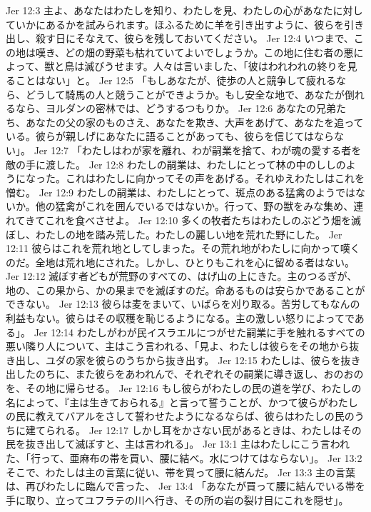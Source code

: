 Jer 12:3  主よ、あなたはわたしを知り、わたしを見、わたしの心があなたに対していかにあるかを試みられます。ほふるために羊を引き出すように、彼らを引き出し、殺す日にそなえて、彼らを残しておいてください。
Jer 12:4  いつまで、この地は嘆き、どの畑の野菜も枯れていてよいでしょうか。この地に住む者の悪によって、獣と鳥は滅びうせます。人々は言いました、「彼はわれわれの終りを見ることはない」と。
Jer 12:5  「もしあなたが、徒歩の人と競争して疲れるなら、どうして騎馬の人と競うことができようか。もし安全な地で、あなたが倒れるなら、ヨルダンの密林では、どうするつもりか。
Jer 12:6  あなたの兄弟たち、あなたの父の家のものさえ、あなたを欺き、大声をあげて、あなたを追っている。彼らが親しげにあなたに語ることがあっても、彼らを信じてはならない」。
Jer 12:7  「わたしはわが家を離れ、わが嗣業を捨て、わが魂の愛する者を敵の手に渡した。
Jer 12:8  わたしの嗣業は、わたしにとって林の中のししのようになった。これはわたしに向かってその声をあげる。それゆえわたしはこれを憎む。
Jer 12:9  わたしの嗣業は、わたしにとって、斑点のある猛禽のようではないか。他の猛禽がこれを囲んでいるではないか。行って、野の獣をみな集め、連れてきてこれを食べさせよ。
Jer 12:10  多くの牧者たちはわたしのぶどう畑を滅ぼし、わたしの地を踏み荒した。わたしの麗しい地を荒れた野にした。
Jer 12:11  彼らはこれを荒れ地としてしまった。その荒れ地がわたしに向かって嘆くのだ。全地は荒れ地にされた。しかし、ひとりもこれを心に留める者はない。
Jer 12:12  滅ぼす者どもが荒野のすべての、はげ山の上にきた。主のつるぎが、地の、この果から、かの果までを滅ぼすのだ。命あるものは安らかであることができない。
Jer 12:13  彼らは麦をまいて、いばらを刈り取る。苦労してもなんの利益もない。彼らはその収穫を恥じるようになる。主の激しい怒りによってである」。
Jer 12:14  わたしがわが民イスラエルにつがせた嗣業に手を触れるすべての悪い隣り人について、主はこう言われる、「見よ、わたしは彼らをその地から抜き出し、ユダの家を彼らのうちから抜き出す。
Jer 12:15  わたしは、彼らを抜き出したのちに、また彼らをあわれんで、それぞれその嗣業に導き返し、おのおのを、その地に帰らせる。
Jer 12:16  もし彼らがわたしの民の道を学び、わたしの名によって、『主は生きておられる』と言って誓うことが、かつて彼らがわたしの民に教えてバアルをさして誓わせたようになるならば、彼らはわたしの民のうちに建てられる。
Jer 12:17  しかし耳をかさない民があるときは、わたしはその民を抜き出して滅ぼすと、主は言われる」。
Jer 13:1  主はわたしにこう言われた、「行って、亜麻布の帯を買い、腰に結べ。水につけてはならない」。
Jer 13:2  そこで、わたしは主の言葉に従い、帯を買って腰に結んだ。
Jer 13:3  主の言葉は、再びわたしに臨んで言った、
Jer 13:4  「あなたが買って腰に結んでいる帯を手に取り、立ってユフラテの川へ行き、その所の岩の裂け目にこれを隠せ」。
